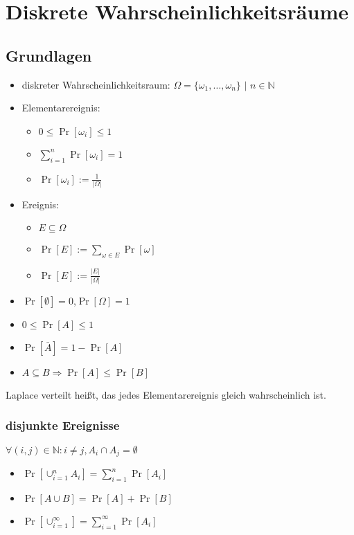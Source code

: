 
\section{Diskrete Wahrscheinlichkeitsräume}

\subsection{Grundlagen}

\begin{itemize}
\item diskreter Wahrscheinlichkeitsraum: $\Omega = \{\omega_1,\ldots,\omega_n\}$ $|$ $n\in \mathbb{N}$
\item Elementarereignis:\\
	\begin{itemize}
	\item $0 \leq \Pr[\omega_i]\leq 1$
	\item $\sum_{i=1}^n\Pr[\omega_i]=1$
	\item $\Pr[\omega_i]:=\frac{1}{|\Omega|}$
	\end{itemize}
\item Ereignis:\\
	\begin{itemize}
	\item $E\subseteq\Omega$
	\item $\Pr[E]:=\sum_{\omega\in E}\Pr[\omega]$
	\item $\Pr[E]:=\frac{|E|}{|\Omega|}$
	\end{itemize}
\item $\Pr[\emptyset]=0$,$\Pr[\Omega]=1$ 
\item $0\leq \Pr[A] \leq 1$
\item $\Pr[\bar A]=1-\Pr[A]$
\item $A\subseteq B \Rightarrow \Pr[A]\leq \Pr[B]$
\end{itemize}

Laplace verteilt heißt, das jedes Elementarereignis gleich wahrscheinlich ist.

\subsubsection{disjunkte Ereignisse}
$\forall(i,j)\in\mathbb{N}: i\neq j, A_i\cap  A_j=\emptyset$
\begin{itemize}
\item $\Pr[\cup^n_{i=1}A_i]=\sum^n_{i=1}\Pr[A_i]$
\item $\Pr[A\cup B]=\Pr[A]+\Pr[B]$
\item $\Pr[\cup^\infty_{i=1}]=\sum^\infty_{i=1}\Pr[A_i]$
\end{itemize}

